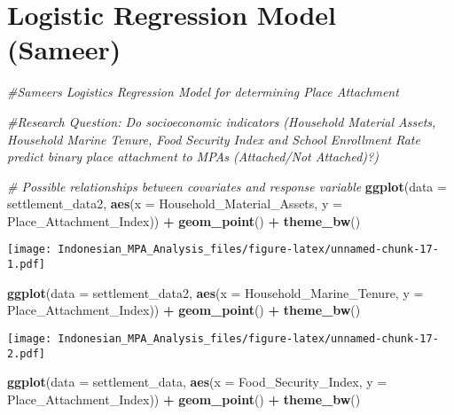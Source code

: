 \documentclass[
]{article}
\newenvironment{Shaded}{\begin{snugshade}}{\end{snugshade}}
\newcommand{\AttributeTok}[1]{\textcolor[rgb]{0.13,0.29,0.53}{#1}}
\newcommand{\CommentTok}[1]{\textcolor[rgb]{0.56,0.35,0.01}{\textit{#1}}}
\newcommand{\FunctionTok}[1]{\textcolor[rgb]{0.13,0.29,0.53}{\textbf{#1}}}
\newcommand{\NormalTok}[1]{#1}
\newcommand{\SpecialCharTok}[1]{\textcolor[rgb]{0.81,0.36,0.00}{\textbf{#1}}}
\begin{document}
\section{Logistic Regression Model
(Sameer)}\label{logistic-regression-model-sameer}

\begin{Shaded}
\begin{Highlighting}[]
\CommentTok{\#Sameer\textquotesingle{}s Logistics Regression Model for determining Place Attachment}

\CommentTok{\#Research Question: Do socioeconomic indicators (Household Material Assets, Household Marine Tenure, Food Security Index and School Enrollment Rate predict binary place attachment to MPAs (Attached/Not Attached)?)}
\end{Highlighting}
\end{Shaded}

\begin{Shaded}
\begin{Highlighting}[]
\CommentTok{\# Possible relationships between covariates and response variable}
\FunctionTok{ggplot}\NormalTok{(}\AttributeTok{data =}\NormalTok{ settlement\_data2, }\FunctionTok{aes}\NormalTok{(}\AttributeTok{x =}\NormalTok{ Household\_Material\_Assets, }
                                    \AttributeTok{y =}\NormalTok{ Place\_Attachment\_Index)) }\SpecialCharTok{+}
  \FunctionTok{geom\_point}\NormalTok{() }\SpecialCharTok{+}
  \FunctionTok{theme\_bw}\NormalTok{()}
\end{Highlighting}
\end{Shaded}

\texttt{[image: Indonesian\_MPA\_Analysis\_files/figure-latex/unnamed-chunk-17-1.pdf]}

\begin{Shaded}
\begin{Highlighting}[]
\FunctionTok{ggplot}\NormalTok{(}\AttributeTok{data =}\NormalTok{ settlement\_data2, }\FunctionTok{aes}\NormalTok{(}\AttributeTok{x =}\NormalTok{ Household\_Marine\_Tenure, }
                                    \AttributeTok{y =}\NormalTok{ Place\_Attachment\_Index)) }\SpecialCharTok{+}
  \FunctionTok{geom\_point}\NormalTok{() }\SpecialCharTok{+}
  \FunctionTok{theme\_bw}\NormalTok{()}
\end{Highlighting}
\end{Shaded}

\texttt{[image: Indonesian\_MPA\_Analysis\_files/figure-latex/unnamed-chunk-17-2.pdf]}

\begin{Shaded}
\begin{Highlighting}[]
\FunctionTok{ggplot}\NormalTok{(}\AttributeTok{data =}\NormalTok{ settlement\_data, }\FunctionTok{aes}\NormalTok{(}\AttributeTok{x =}\NormalTok{ Food\_Security\_Index, }
                                   \AttributeTok{y =}\NormalTok{ Place\_Attachment\_Index)) }\SpecialCharTok{+}
  \FunctionTok{geom\_point}\NormalTok{() }\SpecialCharTok{+}
  \FunctionTok{theme\_bw}\NormalTok{()}
\end{Highlighting}
\end{Shaded}
\end{document}
